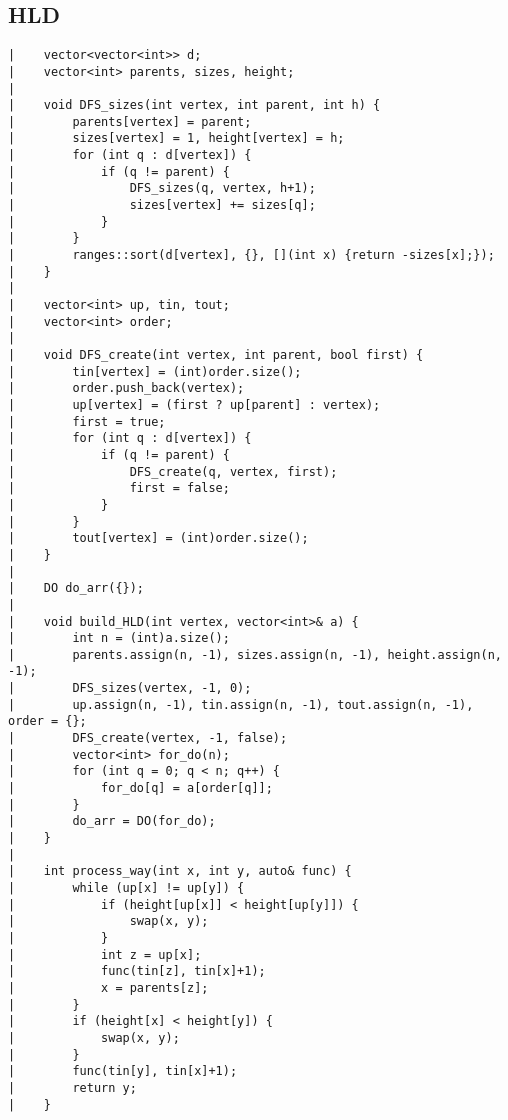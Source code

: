 \documentclass[a4paper, 10pt]{article}
\begin{document}
\begin{center}
\section*{HLD}
\begin{verbatim}
|    vector<vector<int>> d;
|    vector<int> parents, sizes, height;
|    
|    void DFS_sizes(int vertex, int parent, int h) {
|        parents[vertex] = parent;
|        sizes[vertex] = 1, height[vertex] = h;
|        for (int q : d[vertex]) {
|            if (q != parent) {
|                DFS_sizes(q, vertex, h+1);
|                sizes[vertex] += sizes[q];
|            }
|        }
|        ranges::sort(d[vertex], {}, [](int x) {return -sizes[x];});
|    }
|    
|    vector<int> up, tin, tout;
|    vector<int> order;
|    
|    void DFS_create(int vertex, int parent, bool first) {
|        tin[vertex] = (int)order.size();
|        order.push_back(vertex);
|        up[vertex] = (first ? up[parent] : vertex);
|        first = true;
|        for (int q : d[vertex]) {
|            if (q != parent) {
|                DFS_create(q, vertex, first);
|                first = false;
|            }
|        }
|        tout[vertex] = (int)order.size();
|    }
|    
|    DO do_arr({});
|    
|    void build_HLD(int vertex, vector<int>& a) {
|        int n = (int)a.size();
|        parents.assign(n, -1), sizes.assign(n, -1), height.assign(n, -1);
|        DFS_sizes(vertex, -1, 0);
|        up.assign(n, -1), tin.assign(n, -1), tout.assign(n, -1), order = {};
|        DFS_create(vertex, -1, false);
|        vector<int> for_do(n);
|        for (int q = 0; q < n; q++) {
|            for_do[q] = a[order[q]];
|        }
|        do_arr = DO(for_do);
|    }
|    
|    int process_way(int x, int y, auto& func) {
|        while (up[x] != up[y]) {
|            if (height[up[x]] < height[up[y]]) {
|                swap(x, y);
|            }
|            int z = up[x];
|            func(tin[z], tin[x]+1);
|            x = parents[z];
|        }
|        if (height[x] < height[y]) {
|            swap(x, y);
|        }
|        func(tin[y], tin[x]+1);
|        return y;
|    }
\end{verbatim}


\end{center}
\end{document}
